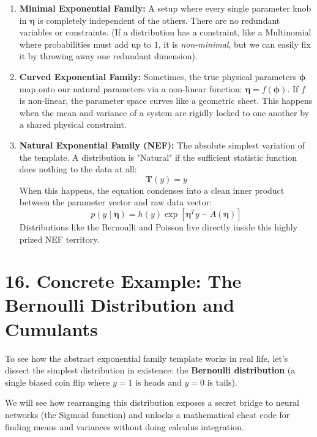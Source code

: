 \documentclass{article}
\begin{document}
\begin{enumerate}
    \item \textbf{Minimal Exponential Family:} A setup where every single parameter knob in $\boldsymbol{\eta}$ is completely independent of the others. There are no redundant variables or constraints. (If a distribution has a constraint, like a Multinomial where probabilities must add up to $1$, it is \textit{non-minimal}, but we can easily fix it by throwing away one redundant dimension).
    
    \item \textbf{Curved Exponential Family:} Sometimes, the true physical parameters $\boldsymbol{\phi}$ map onto our natural parameters via a non-linear function: $\boldsymbol{\eta} = f(\boldsymbol{\phi})$. If $f$ is non-linear, the parameter space curves like a geometric sheet. This happens when the mean and variance of a system are rigidly locked to one another by a shared physical constraint.
    
    \item \textbf{Natural Exponential Family (NEF):} The absolute simplest variation of the template. A distribution is "Natural" if the sufficient statistic function does nothing to the data at all: 
    \begin{equation*}
    \mathbf{T}(y) = y
    \end{equation*}
    When this happens, the equation condenses into a clean inner product between the parameter vector and raw data vector:
    \begin{equation}
    p(y \mid \boldsymbol{\eta}) = h(y) \exp\left[ \boldsymbol{\eta}^T y - A(\boldsymbol{\eta}) \right] \tag{78}
    \end{equation}
    Distributions like the Bernoulli and Poisson live directly inside this highly prized NEF territory.
\end{enumerate}

\section*{16. Concrete Example: The Bernoulli Distribution and Cumulants}

To see how the abstract exponential family template works in real life, let's dissect the simplest distribution in existence: the \textbf{Bernoulli distribution} (a single biased coin flip where $y=1$ is heads and $y=0$ is tails). 

We will see how rearranging this distribution exposes a secret bridge to neural networks (the Sigmoid function) and unlocks a mathematical cheat code for finding means and variances without doing calculus integration.
\end{document}
